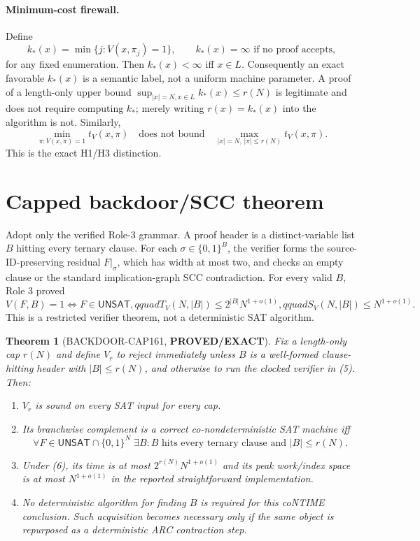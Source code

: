 \documentclass[11pt]{article}
\newtheorem{theorem}{Theorem}
\newcommand{\UNSAT}{\mathsf{UNSAT}}
\newcommand{\status}[1]{\textbf{#1}}
\begin{document}
\paragraph{Minimum-cost firewall.}
Define
\[
 k_*(x)=\min\{j:V(x,\pi_j)=1\},\qquad k_*(x)=\infty
 \text{ if no proof accepts},                                      \tag{3}
\]
for any fixed enumeration.  Then $k_*(x)<\infty$ iff $x\in L$.
Consequently an exact favorable $k_*(x)$ is a semantic label, not a uniform
machine parameter.  A proof of a length-only upper bound
$\sup_{|x|=N,x\in L}k_*(x)\le r(N)$ is legitimate and does not require
computing $k_*$; merely writing $r(x)=k_*(x)$ into the algorithm is not.
Similarly,
\[
 \min_{\pi:V(x,\pi)=1}t_V(x,\pi)
 \quad\text{does not bound}\quad
 \max_{|x|=N,\,|\pi|\le r(N)}t_V(x,\pi).                         \tag{4}
\]
This is the exact H1/H3 distinction.

\section{Capped backdoor/SCC theorem}

Adopt only the verified Role-3 grammar.  A proof header is a distinct-variable
list $B$ hitting every ternary clause.  For each
$\sigma\in\{0,1\}^{B}$, the verifier forms the source-ID-preserving residual
$F|_\sigma$, which has width at most two, and checks an empty clause or the
standard implication-graph SCC contradiction.  For every valid $B$, Role 3
proved
\[
 V(F,B)=1\iff F\in\UNSAT,qquad
 T_V(N,|B|)\le 2^{|B|}N^{1+o(1)},qquad
 S_V(N,|B|)\le N^{1+o(1)}.                                      \tag{5}
\]
This is a restricted verifier theorem, not a deterministic SAT algorithm.

\begin{theorem}[BACKDOOR-CAP161, \status{PROVED/EXACT}]
Fix a length-only cap $r(N)$ and define $V_r$ to reject immediately unless
$B$ is a well-formed clause-hitting header with $|B|\le r(N)$, and otherwise
to run the clocked verifier in (5).  Then:
\begin{enumerate}
\item $V_r$ is sound on every SAT input for every cap.
\item Its branchwise complement is a correct co-nondeterministic SAT machine
      iff
\[
 \forall F\in\UNSAT\cap\{0,1\}^{N}\;\exists B:
 B\text{ hits every ternary clause and }|B|\le r(N).             \tag{6}
\]
\item Under (6), its time is at most
      $2^{r(N)}N^{1+o(1)}$ and its peak work/index space is at most
      $N^{1+o(1)}$ in the reported straightforward implementation.
\item No deterministic algorithm for finding $B$ is required for this
      coNTIME conclusion.  Such acquisition becomes necessary only if the
      same object is repurposed as a deterministic ARC contraction step.
\end{enumerate}
\end{theorem}
\end{document}
